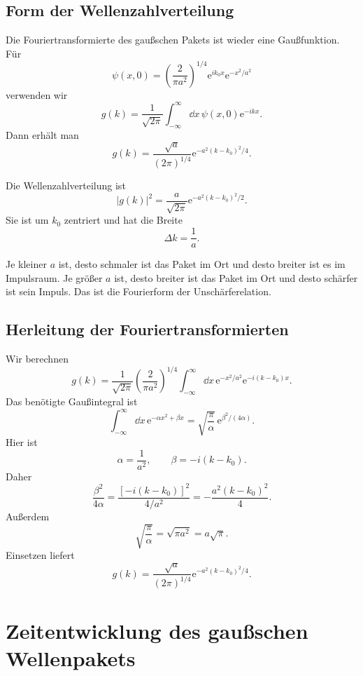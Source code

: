 \subsection{Form der Wellenzahlverteilung}

Die Fouriertransformierte des gaußschen Pakets ist wieder eine Gaußfunktion. Für
\[
    \psi(x,0)=\left(\frac{2}{\pi a^2}\right)^{1/4}
    \mathrm{e}^{ik_0x}\mathrm{e}^{-x^2/a^2}
\]
verwenden wir
\[
    g(k)=\frac{1}{\sqrt{2\pi}}\int_{-\infty}^{\infty}\dd x\,
    \psi(x,0)\mathrm{e}^{-ikx}.
\]
Dann erhält man
\[
    g(k)=\frac{\sqrt{a}}{(2\pi)^{1/4}}
    \mathrm{e}^{-a^2(k-k_0)^2/4}.
\]

\begin{formulabox}
Die Wellenzahlverteilung ist
\[
    |g(k)|^2=\frac{a}{\sqrt{2\pi}}
    \mathrm{e}^{-a^2(k-k_0)^2/2}.
\]
Sie ist um $k_0$ zentriert und hat die Breite
\[
    \Delta k=\frac{1}{a}.
\]
\end{formulabox}

\begin{notebox}
Je kleiner $a$ ist, desto schmaler ist das Paket im Ort und desto breiter ist es im Impulsraum. Je größer $a$ ist, desto breiter ist das Paket im Ort und desto schärfer ist sein Impuls. Das ist die Fourierform der Unschärferelation.
\end{notebox}

\subsection{Herleitung der Fouriertransformierten}

\begin{derivationbox}
Wir berechnen
\[
    g(k)=\frac{1}{\sqrt{2\pi}}\left(\frac{2}{\pi a^2}\right)^{1/4}
    \int_{-\infty}^{\infty}\dd x\,
    \mathrm{e}^{-x^2/a^2}\mathrm{e}^{-i(k-k_0)x}.
\]
Das benötigte Gaußintegral ist
\[
    \int_{-\infty}^{\infty}\dd x\,
    \mathrm{e}^{-\alpha x^2+\beta x}
    =\sqrt{\frac{\pi}{\alpha}}\,
    \mathrm{e}^{\beta^2/(4\alpha)}.
\]
Hier ist
\[
    \alpha=\frac{1}{a^2},
    \qquad
    \beta=-i(k-k_0).
\]
Daher
\[
    \frac{\beta^2}{4\alpha}
    =\frac{[-i(k-k_0)]^2}{4/a^2}
    =-\frac{a^2(k-k_0)^2}{4}.
\]
Außerdem
\[
    \sqrt{\frac{\pi}{\alpha}}=\sqrt{\pi a^2}=a\sqrt{\pi}.
\]
Einsetzen liefert
\[
    g(k)=\frac{\sqrt{a}}{(2\pi)^{1/4}}
    \mathrm{e}^{-a^2(k-k_0)^2/4}.
\]
\end{derivationbox}

\section{Zeitentwicklung des gaußschen Wellenpakets}

